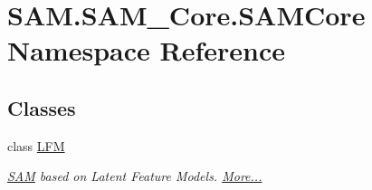 \hypertarget{namespaceSAM_1_1SAM__Core_1_1SAMCore}{}\section{S\+A\+M.\+S\+A\+M\+\_\+\+Core.\+S\+A\+M\+Core Namespace Reference}
\label{namespaceSAM_1_1SAM__Core_1_1SAMCore}
\subsection*{Classes}
\begin{DoxyCompactItemize}
\item 
class \hyperlink{group__icubclient__SAM__Core_classSAM_1_1SAM__Core_1_1SAMCore_1_1LFM}{L\+FM}
\begin{DoxyCompactList}\small\item\em \hyperlink{namespaceSAM}{S\+AM} based on Latent Feature Models.  \hyperlink{group__icubclient__SAM__Core_classSAM_1_1SAM__Core_1_1SAMCore_1_1LFM}{More...}\end{DoxyCompactList}\end{DoxyCompactItemize}
